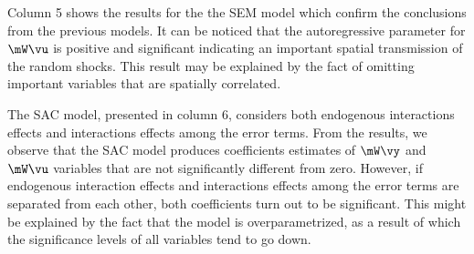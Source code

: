 Column 5 shows the results for the the SEM model which confirm the conclusions from the previous models. It can be noticed that the autoregressive parameter for $\mW\vu$ is positive and significant indicating an important spatial transmission of the random shocks. This result may be explained by the fact of omitting important variables that are spatially correlated. 

The SAC model, presented in column 6, considers both endogenous interactions effects and interactions effects among the error terms. From the results, we observe that the SAC model produces coefficients estimates of $\mW\vy$ and $\mW\vu$ variables that are not significantly different from zero. However, if endogenous interaction effects and interactions effects among the error terms are separated from each other, both coefficients turn out to be significant. This might be explained by the fact that the model is overparametrized, as a result of which the significance levels of all variables tend to go down. 


